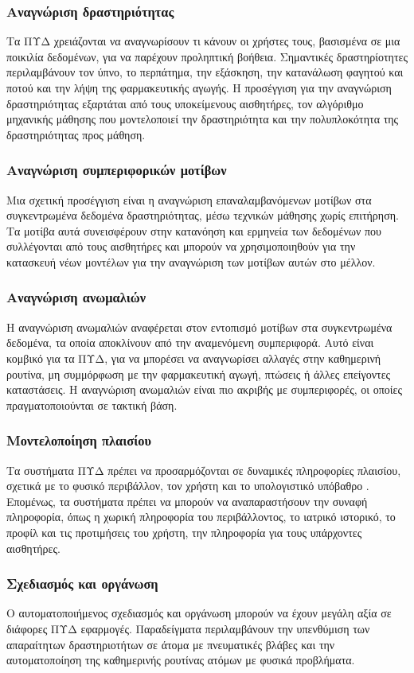 \subsubsection{Αναγνώριση δραστηριότητας}
Τα ΠΥΔ χρειάζονται να αναγνωρίσουν τι κάνουν οι χρήστες τους, βασισμένα σε μια ποικιλία δεδομένων, για να παρέχουν προληπτική βοήθεια.
Σημαντικές δραστηρίοτητες περιλαμβάνουν τον ύπνο, το περπάτημα, την εξάσκηση, την κατανάλωση φαγητού και ποτού και την λήψη της φαρμακευτικής αγωγής.
Η προσέγγιση για την αναγνώριση δραστηριότητας εξαρτάται από τους υποκείμενους αισθητήρες, τον αλγόριθμο μηχανικής μάθησης που μοντελοποιεί την δραστηριότητα και την πολυπλοκότητα της δραστηριότητας προς μάθηση.
\subsubsection{Αναγνώριση συμπεριφορικών μοτίβων}
Μια σχετική προσέγγιση είναι η αναγνώριση επαναλαμβανόμενων μοτίβων στα συγκεντρωμένα δεδομένα δραστηριότητας, μέσω τεχνικών μάθησης χωρίς επιτήρηση.
Τα μοτίβα αυτά συνεισφέρουν στην κατανόηση και ερμηνεία των δεδομένων που συλλέγονται από τους αισθητήρες και μπορούν να χρησιμοποιηθούν για την κατασκευή νέων μοντέλων για την αναγνώριση των μοτίβων αυτών στο μέλλον.
\subsubsection{Αναγνώριση ανωμαλιών}
Η αναγνώριση ανωμαλιών αναφέρεται στον εντοπισμό μοτίβων στα συγκεντρωμένα δεδομένα, τα οποία αποκλίνουν από την αναμενόμενη συμπεριφορά.
Αυτό είναι κομβικό για τα ΠΥΔ, για να μπορέσει να αναγνωρίσει αλλαγές στην καθημερινή ρουτίνα, μη συμμόρφωση με την φαρμακευτική αγωγή, πτώσεις ή άλλες επείγοντες καταστάσεις.
Η αναγνώριση ανωμαλιών είναι πιο ακριβής με συμπεριφορές, οι οποίες πραγματοποιούνται σε τακτική βάση.
\subsubsection{Μοντελοποίηση πλαισίου}
Τα συστήματα ΠΥΔ πρέπει να προσαρμόζονται σε δυναμικές πληροφορίες πλαισίου, σχετικά με το φυσικό περιβάλλον, τον χρήστη και το υπολογιστικό υπόβαθρο \cite{Bettini2010}.
Επομένως, τα συστήματα πρέπει να μπορούν να αναπαραστήσουν την συναφή πληροφορία, όπως η χωρική πληροφορία του περιβάλλοντος, το ιατρικό ιστορικό, το προφίλ και τις προτιμήσεις του χρήστη, την πληροφορία για τους υπάρχοντες αισθητήρες.
\subsubsection{Σχεδιασμός και οργάνωση}
Ο αυτοματοποιήμενος σχεδιασμός και οργάνωση μπορούν να έχουν μεγάλη αξία σε διάφορες ΠΥΔ εφαρμογές.
Παραδείγματα περιλαμβάνουν την υπενθύμιση των απαραίτητων δραστηριοτήτων σε άτομα με πνευματικές βλάβες και την αυτοματοποίηση της καθημερινής ρουτίνας ατόμων με φυσικά προβλήματα.
